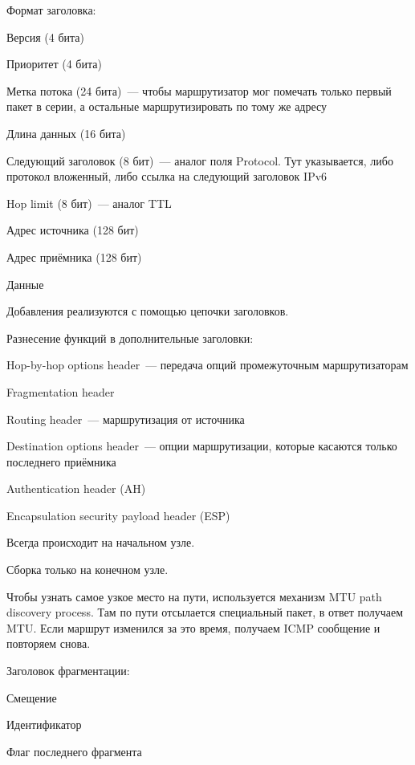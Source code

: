 Формат заголовка:
\begin{MyItemize}
    \item Версия (4 бита)
    \item Приоритет (4 бита)
    \item Метка потока (24 бита)~--- чтобы маршрутизатор мог помечать только первый пакет в серии, а остальные маршрутизировать по тому же адресу
    \item Длина данных (16 бита)
    \item Следующий заголовок (8 бит)~--- аналог поля Protocol. Тут указывается, либо протокол вложенный, либо ссылка на следующий заголовок IPv6
    \item Hop limit (8 бит)~--- аналог TTL
    \item Адрес источника (128 бит)
    \item Адрес приёмника (128 бит)
    \item Данные
\end{MyItemize}

Добавления реализуются с помощью цепочки заголовков.

Разнесение функций в дополнительные заголовки:
\begin{MyItemize}
    \item Hop-by-hop options header~--- передача опций промежуточным маршрутизаторам
    \item Fragmentation header
    \item Routing header~--- маршрутизация от источника
    \item Destination options header~--- опции маршрутизации, которые касаются только последнего приёмника
    \item Authentication header (AH)
    \item Encapsulation security payload header (ESP)
\end{MyItemize}


Всегда происходит на начальном узле.

Сборка только на конечном узле.

Чтобы узнать самое узкое место на пути, используется механизм MTU path discovery process. Там по пути отсылается специальный пакет, в ответ получаем MTU. Если маршрут изменился за это время, получаем ICMP сообщение и повторяем снова.

Заголовок фрагментации:
\begin{MyItemize}
    \item Смещение
    \item Идентификатор
    \item Флаг последнего фрагмента
\end{MyItemize}

